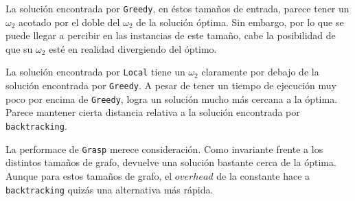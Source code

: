La solución encontrada por \texttt{Greedy}, en éstos tamaños de entrada, parece tener un $\omega_2$ acotado por el doble del $\omega_2$ de la solución óptima. Sin embargo, por lo que se puede llegar a percibir en las instancias de este tamaño, cabe la posibilidad de que su $\omega_2$ esté en realidad divergiendo del óptimo.

La solución encontrada por \texttt{Local} tiene un $\omega_2$ claramente por debajo de la solución encontrada por \texttt{Greedy}. A pesar de tener un tiempo de ejecución muy poco por encima de \texttt{Greedy}, logra un solución mucho más cercana a la óptima. Parece mantener cierta distancia relativa a la solución encontrada por \texttt{backtracking}.

La performace de \texttt{Grasp} merece consideración. Como invariante frente a los distintos tamaños de grafo, devuelve una solución bastante cerca de la óptima. Aunque para estos tamaños de grafo, el $overhead$ de la constante hace a \texttt{backtracking} quizás una alternativa más rápida.


 
